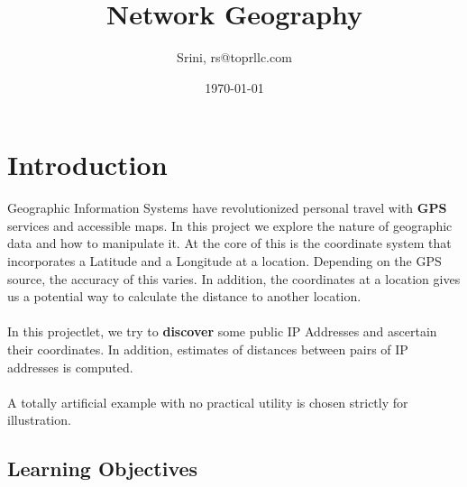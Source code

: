 \documentclass[12pt, a4paper]{article} %
\title{Network Geography} %
\author{Srini, rs@toprllc.com}
\date{\small \today}
\begin{document}
\maketitle %

\setcounter{page}{1}

\section{Introduction}
Geographic Information Systems have revolutionized personal travel with \textbf{GPS} services and accessible maps. In this project we explore the nature of geographic data and how to manipulate it. At the core of this is the coordinate system that incorporates a Latitude and a Longitude at a location. Depending on the GPS source, the accuracy of this varies. In addition, the coordinates at a location gives us a potential way to calculate the distance to another location.

\paragraph{}
In this projectlet, we try to \textbf{discover} some public IP Addresses and ascertain their coordinates. In addition, estimates of distances between pairs of IP addresses is computed.

\paragraph{}
A totally artificial example with no practical utility is chosen strictly for illustration.


\subsection{Learning Objectives}
\end{document}
